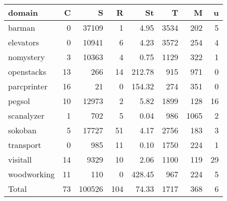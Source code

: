 \begin{table}[htbp]
\centering
\begingroup\small
\begin{tabular}{lrrrrrrr}
  \hline
domain & C & S & R & St & T & M & u \\ 
  \hline
barman &   0 & 37109 &   1 & 4.95 & 3534 & 202 &   5 \\ 
  elevators &   0 & 10941 &   6 & 4.23 & 3572 & 254 &   4 \\ 
  nomystery &   3 & 10363 &   4 & 0.75 & 1129 & 322 &   1 \\ 
  openstacks &  13 & 266 &  14 & 212.78 & 915 & 971 &   0 \\ 
  parcprinter &  16 &  21 &   0 & 154.32 & 274 & 351 &   0 \\ 
  pegsol &  10 & 12973 &   2 & 5.82 & 1899 & 128 &  16 \\ 
  scanalyzer &   1 & 702 &   5 & 0.04 & 986 & 1065 &   2 \\ 
  sokoban &   5 & 17727 &  51 & 4.17 & 2756 & 183 &   3 \\ 
  transport &   0 & 985 &  11 & 0.10 & 1750 & 224 &   1 \\ 
  visitall &  14 & 9329 &  10 & 2.06 & 1100 & 119 &  29 \\ 
  woodworking &  11 & 110 &   0 & 428.45 & 967 & 224 &   5 \\ 
  Total &  73 & 100526 & 104 & 74.33 & 1717 & 368 &   6 \\ 
   \hline
\end{tabular}
\endgroup
\caption{\oursolver{}} 
\label{tab:our}
\end{table}
